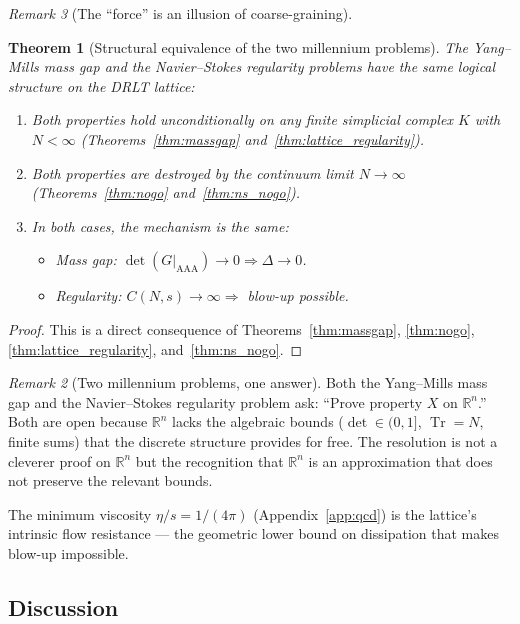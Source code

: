 \documentclass[12pt]{article}
\newtheorem{theorem}{Theorem}[section]
\theoremstyle{remark}
\newtheorem{remark}[theorem]{Remark}
\theoremstyle{definition}
\newcommand{\RR}{\mathbb{R}}
\newcommand{\tr}{\operatorname{Tr}}
\begin{document}
\begin{remark}[The ``force'' is an illusion of coarse-graining]
\begin{theorem}[Structural equivalence of the two millennium problems]
\label{thm:structural_equivalence}
The Yang--Mills mass gap and the Navier--Stokes regularity problems
have the same logical structure on the DRLT lattice:
\begin{enumerate}
\item Both properties hold unconditionally on any finite simplicial
  complex $K$ with $N < \infty$
  (Theorems~\ref{thm:massgap} and~\ref{thm:lattice_regularity}).
\item Both properties are destroyed by the continuum limit
  $N \to \infty$
  (Theorems~\ref{thm:nogo} and~\ref{thm:ns_nogo}).
\item In both cases, the mechanism is the same:
  \begin{itemize}
  \item Mass gap: $\det(G|_{\mathrm{AAA}}) \to 0 \Rightarrow
    \Delta \to 0$.
  \item Regularity: $C(N,s) \to \infty \Rightarrow$ blow-up possible.
  \end{itemize}
\end{enumerate}
\end{theorem}

\begin{proof}
This is a direct consequence of Theorems~\ref{thm:massgap},
\ref{thm:nogo}, \ref{thm:lattice_regularity},
and~\ref{thm:ns_nogo}.
\end{proof}

\begin{remark}[Two millennium problems, one answer]
Both the Yang--Mills mass gap and the Navier--Stokes regularity
problem ask: ``Prove property $X$ on $\RR^n$.''  Both are open
because $\RR^n$ lacks the algebraic bounds ($\det \in (0,1]$,
$\tr = N$, finite sums) that the discrete structure provides for free.
The resolution is not a cleverer proof on $\RR^n$ but the recognition
that $\RR^n$ is an approximation that does not preserve the relevant
bounds.

The minimum viscosity $\eta/s = 1/(4\pi)$
(Appendix~\ref{app:qcd}) is the lattice's intrinsic flow resistance
--- the geometric lower bound on dissipation that makes blow-up
impossible.
\end{remark}

\subsection{Discussion}
\label{sec:discussion}


\end{remark}
\end{document}
